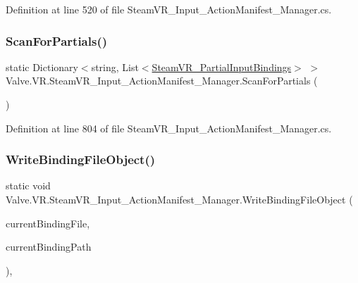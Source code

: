Definition at line 520 of file Steam\+V\+R\+\_\+\+Input\+\_\+\+Action\+Manifest\+\_\+\+Manager.\+cs.

\mbox{\label{class_valve_1_1_v_r_1_1_steam_v_r___input___action_manifest___manager_a7bba008b67bd60cfb82994486c11fab0}} 
\subsubsection{\texorpdfstring{ScanForPartials()}{ScanForPartials()}}
{\footnotesize\ttfamily static Dictionary$<$string, List$<$\mbox{\hyperlink{class_valve_1_1_v_r_1_1_steam_v_r___partial_input_bindings}{Steam\+V\+R\+\_\+\+Partial\+Input\+Bindings}}$>$ $>$ Valve.\+V\+R.\+Steam\+V\+R\+\_\+\+Input\+\_\+\+Action\+Manifest\+\_\+\+Manager.\+Scan\+For\+Partials (\begin{DoxyParamCaption}{ }\end{DoxyParamCaption})\hspace{0.3cm}{\ttfamily [static]}}



Definition at line 804 of file Steam\+V\+R\+\_\+\+Input\+\_\+\+Action\+Manifest\+\_\+\+Manager.\+cs.

\mbox{\label{class_valve_1_1_v_r_1_1_steam_v_r___input___action_manifest___manager_ab87ae830f2769600bc2073e0f9bd4ab5}} 
\subsubsection{\texorpdfstring{WriteBindingFileObject()}{WriteBindingFileObject()}}
{\footnotesize\ttfamily static void Valve.\+V\+R.\+Steam\+V\+R\+\_\+\+Input\+\_\+\+Action\+Manifest\+\_\+\+Manager.\+Write\+Binding\+File\+Object (\begin{DoxyParamCaption}\item[{\mbox{\hyperlink{class_valve_1_1_v_r_1_1_steam_v_r___input___binding_file}{Steam\+V\+R\+\_\+\+Input\+\_\+\+Binding\+File}}}]{current\+Binding\+File,  }\item[{string}]{current\+Binding\+Path }\end{DoxyParamCaption})\hspace{0.3cm}{\ttfamily [static]}, {\ttfamily [protected]}}



